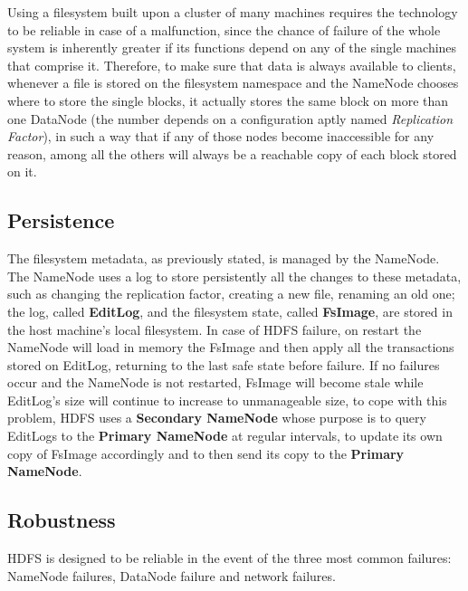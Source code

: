 Using a filesystem built upon a cluster of many machines requires the technology to be reliable in case of a malfunction, since the chance of failure of the whole system is inherently greater if its functions depend on any of the single machines that comprise it. \newline Therefore, to make sure that data is always available to clients, whenever a file is stored on the filesystem namespace and the NameNode chooses where to store the single blocks, it actually stores the same block on more than one DataNode (the number depends on a configuration aptly named \textit{Replication Factor}), in such a way that if any of those nodes become inaccessible for any reason, among all the others will always be a reachable copy of each block stored on it.

\subsection{Persistence}

The filesystem metadata, as previously stated, is managed by the NameNode. The NameNode uses a log to store persistently all the changes to these metadata, such as changing the replication factor, creating a new file, renaming an old one; the log, called \textbf{EditLog}, and the filesystem state, called \textbf{FsImage}, are stored in the host machine's local filesystem.\newline
In case of HDFS failure, on restart the NameNode will load in memory the FsImage and then apply all the transactions stored on EditLog, returning to the last safe state before failure.
\newline
If no failures occur and the NameNode is not restarted, FsImage will become stale while EditLog's size will continue to increase to unmanageable size, to cope with this problem, HDFS uses a \textbf{Secondary NameNode} whose purpose is to query EditLogs to the \textbf{Primary NameNode} at regular intervals, to update its own copy of FsImage accordingly and to then send its copy to the \textbf{Primary NameNode}.

\subsection{Robustness}

HDFS is designed to be reliable in the event of the three most common failures: NameNode failures, DataNode failure and network failures.

